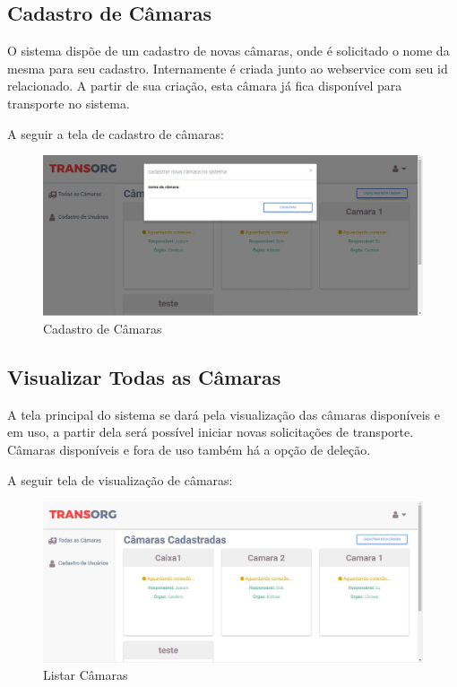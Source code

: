 \subsection{Cadastro de Câmaras}
	O sistema dispõe de um cadastro de novas câmaras, onde é solicitado o nome da mesma para seu cadastro. Internamente é criada junto ao webservice com seu id relacionado. A partir de sua criação, esta câmara já fica disponível para transporte no sistema.
	
	A seguir a tela de cadastro de câmaras:

\begin{figure}[H]
\centering
\includegraphics[width=16cm]{figuras/cadastroCamaras_software.JPG}
\caption{Cadastro de Câmaras}
\end{figure}

\subsection{Visualizar Todas as Câmaras}
	A tela principal do sistema se dará pela visualização das câmaras disponíveis e em uso, a partir dela será possível iniciar novas solicitações de transporte. Câmaras disponíveis e fora de uso também há a opção de deleção.
	
	A seguir tela de visualização de câmaras:

\begin{figure}[H]
\centering
\includegraphics[width=16cm]{figuras/listaCamaras_software.JPG}
\caption{Listar Câmaras}
\end{figure}

